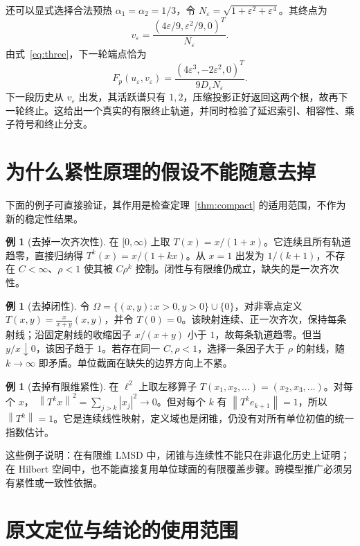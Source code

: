 \documentclass[UTF8,zihao=-4,a4paper]{ctexart}
\theoremstyle{definition}\newtheorem{example}[theorem]{例}
\newcommand{\norm}[1]{\left\lVert#1\right\rVert}
\begin{document}
还可以显式选择合法预热 $\alpha_1=\alpha_2=1/3$，令
$N_\varepsilon=\sqrt{1+\varepsilon^2+\varepsilon^4}$。其终点为
\[
 v_\varepsilon=\frac{(4\varepsilon/9,\varepsilon^2/9,0)^T}{N_\varepsilon}.
\]
由式~\eqref{eq:three}，下一轮端点恰为
\[
 F_p(u_\varepsilon,v_\varepsilon)
 =\frac{(4\varepsilon^3,-2\varepsilon^2,0)^T}
        {9D_\varepsilon N_\varepsilon}.
\]
下一段历史从 $v_\varepsilon$ 出发，其活跃谱只有 $1,2$，压缩投影正好返回这两个根，故再下一轮终止。这给出一个真实的有限终止轨道，并同时检验了延迟索引、相容性、乘子符号和终止分支。

\section{为什么紧性原理的假设不能随意去掉}

下面的例子可直接验证，其作用是检查定理~\ref{thm:compact} 的适用范围，不作为新的稳定性结果。

\begin{example}[去掉一次齐次性]
在 $[0,\infty)$ 上取 $T(x)=x/(1+x)$。它连续且所有轨道趋零，直接归纳得
$T^k(x)=x/(1+kx)$。从 $x=1$ 出发为 $1/(k+1)$，不存在 $C<\infty$、$\rho<1$ 使其被 $C\rho^k$ 控制。闭性与有限维仍成立，缺失的是一次齐次性。
\end{example}

\begin{example}[去掉闭性]
令 $\Omega=\{(x,y):x>0,y>0\}\cup\{0\}$，对非零点定义
$T(x,y)=\frac{x}{x+y}(x,y)$，并令 $T(0)=0$。该映射连续、正一次齐次，保持每条射线；沿固定射线的收缩因子 $x/(x+y)$ 小于 $1$，故每条轨道趋零。但当 $y/x\downarrow0$，该因子趋于 $1$。若存在同一 $C,\rho<1$，选择一条因子大于 $\rho$ 的射线，随 $k\to\infty$ 即矛盾。单位截面在缺失的边界方向上不紧。
\end{example}

\begin{example}[去掉有限维紧性]
在 $\ell^2$ 上取左移算子
$T(x_1,x_2,\ldots)=(x_2,x_3,\ldots)$。对每个 $x$，
$\norm{T^kx}^2=\sum_{j>k}|x_j|^2\to0$。但对每个 $k$ 有
$\norm{T^ke_{k+1}}=1$，所以 $\norm{T^k}=1$。它是连续线性映射，定义域也是闭锥，仍没有对所有单位初值的统一指数估计。
\end{example}

这些例子说明：在有限维 LMSD 中，闭锥与连续性不能只在非退化历史上证明；在 Hilbert 空间中，也不能直接复用单位球面的有限覆盖步骤。跨模型推广必须另有紧性或一致性依据。

\section{原文定位与结论的使用范围}\label{sec:scope}
\end{document}
